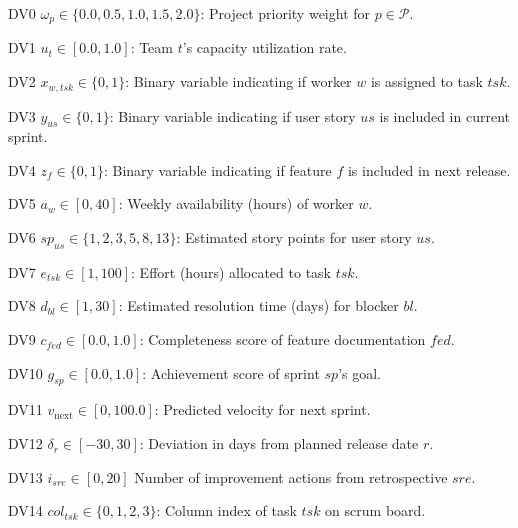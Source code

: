 \documentclass[12pt]{article}
\begin{document}
\item[DV0] $\omega_p \in \{0.0, 0.5, 1.0, 1.5, 2.0\}$: Project priority weight for $p \in \mathcal{P}$.
    \item[DV1] $u_t \in [0.0, 1.0]$: Team $t$'s capacity utilization rate.
    \item[DV2] $x_{w,tsk} \in \{0,1\}$: Binary variable indicating if worker $w$ is assigned to task $tsk$.
    \item[DV3] $y_{us} \in \{0,1\}$: Binary variable indicating if user story $us$ is included in current sprint.
    \item[DV4] $z_f \in \{0,1\}$: Binary variable indicating if feature $f$ is included in next release.
    \item[DV5] $a_w \in [0, 40]$: Weekly availability (hours) of worker $w$.
    \item[DV6] $sp_{us} \in \{1,2,3,5,8,13\}$: Estimated story points for user story $us$.
    \item[DV7] $e_{tsk} \in [1, 100]$: Effort (hours) allocated to task $tsk$.
    \item[DV8] $d_{bl} \in [1, 30]$: Estimated resolution time (days) for blocker $bl$.
    \item[DV9] $c_{fed} \in [0.0, 1.0]$: Completeness score of feature documentation $fed$.
    \item[DV10] $g_{sp} \in [0.0, 1.0]$: Achievement score of sprint $sp$'s goal.
    \item[DV11] $v_{\text{next}} \in [0, 100.0]$: Predicted velocity for next sprint.
    \item[DV12] $\delta_r \in [-30, 30]$: Deviation in days from planned release date $r$.
    \item[DV13] $i_{sre} \in [0, 20]$ Number of improvement actions from retrospective $sre$.
    \item[DV14] $col_{tsk} \in \{0,1,2,3\}$: Column index of task $tsk$ on scrum board.
\end{document}

